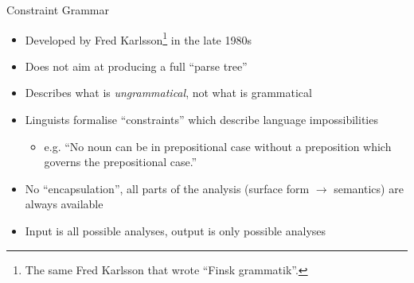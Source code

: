 \documentclass{beamer}
\begin{document}
\begin{frame}{Constraint Grammar}

    \begin{itemize}
      \item Developed by Fred Karlsson\footnote{The same Fred Karlsson that wrote ``Finsk grammatik''.} in the late 1980s
      \item Does not aim at producing a full ``parse tree''
      \item Describes what is \emph{ungrammatical}, not what is grammatical
      \item Linguists formalise ``constraints'' which describe language impossibilities
      \begin{itemize}
        \item e.g. ``No noun can be in prepositional case without a preposition which 
          governs the prepositional case.''
      \end{itemize}
      \item No ``encapsulation'', all parts of the analysis (surface form $\rightarrow$ semantics) are always available
      \item Input is all possible analyses, output is only possible analyses
    \end{itemize}

\end{frame}
\end{document}
